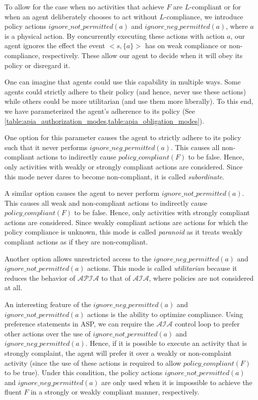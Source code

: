 To allow for the case when no activities that achieve $F$ are $L$-compliant or for when an agent deliberately chooses to act without $L$-compliance, we introduce policy actions $ignore\_not\_permitted(a)$ and $ignore\_neg\_permitted(a)$, where $a$ is a physical action.
By concurrently executing these actions with action $a$, our agent ignores the effect the event $<s, \{a\}>$ has on weak compliance or non-compliance, respectively.
These allow our agent to decide when it will obey its policy or disregard it.

One can imagine that agents could use this capability in multiple ways.
Some agents could strictly adhere to their policy (and hence, never use these actions) while others could be more utilitarian (and use them more liberally).
To this end, we have parameterized the agent's adherence to its policy (See \cref{table:apia_authorization_modes,table:apia_obligation_modes}).

One option for this parameter causes the agent to strictly adhere to its policy such that it never performs $ignore\_neg\_permitted(a)$.
This causes all non-compliant actions to indirectly cause $policy\_compliant(F)$ to be false.
Hence, only activities with weakly or strongly compliant actions are considered.
Since this mode never dares to become non-compliant, it is called \textit{subordinate}.

A similar option causes the agent to never perform $ignore\_not\_permitted(a)$.
This causes all weak and non-compliant actions to indirectly cause $policy\_compliant(F)$ to be false.
Hence, only activities with strongly compliant actions are considered.
Since weakly compliant actions are actions for which the policy compliance is unknown, this mode is called \textit{paranoid} as it treats weakly compliant actions as if they are non-compliant.

Another option allows unrestricted access to the $ignore\_neg\_permitted(a)$ and $ignore\_not\_permitted(a)$ actions.
This mode is called \textit{utilitarian} because it reduces the behavior of $\mathcal{APIA}$ to that of $\mathcal{AIA}$, where policies are not considered at all.

An interesting feature of the $ignore\_neg\_permitted(a)$ and $ignore\_not\_permitted(a)$ actions is the ability to optimize compliance.
Using preference statements in ASP, we can require the $\mathcal{AIA}$ control loop to prefer other actions over the use of $ignore\_not\_permitted(a)$ and $ignore\_neg\_permitted(a)$.
Hence, if it is possible to execute an activity that is strongly complaint, the agent will prefer it over a weakly or non-complaint activity (since the use of these actions is required to allow $policy\_compliant(F)$ to be true).
Under this condition, the policy actions $ignore\_not\_permitted(a)$ and $ignore\_neg\_permitted(a)$ are only used when it is impossible to achieve the fluent $F$ in a strongly or weakly compliant manner, respectively.

